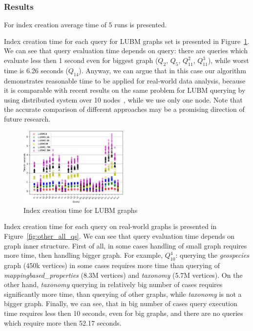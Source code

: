 \subsubsection{Results}

For index creation average time of 5 runs is presented.

Index creation time for each query for LUBM graphs set is presented in Figure~\ref{fig:lubm_all_qs}.
We can see that query evaluation time depends on query: there are queries which evaluate less then 1 second even for biggest graph ($Q_2$, $Q_5$, $Q_{11}^2$, $Q_{11}^3$), while worst time is 6.26 seconds ($Q_{14}$).
Anyway, we can argue that in this case our algorithm demonstrates reasonable time to be applied for real-world data analysis, because it is comparable with recent results on the same problem for LUBM querying by using distributed system over 10 nodes~\cite{Wang2019}, while we use only one node. 
Note that the accurate comparison of different approaches may be a promising direction of future research.

\begin{figure}
   \includegraphics[width=0.48\textwidth]{data/LUBM_all.pdf}
   \caption{Index creation time for LUBM graphs}
   \label{fig:lubm_all_qs}
\end{figure}

Index creation time for each query on real-world graphs is presented in Figure~\ref{fig:other_all_qs}.
We can see that query evaluation time depends on graph inner structure. 
First of all, in some cases handling of small graph requires more time, then handling bigger graph.
For example, $Q_{10}^4$: querying the \textit{geospecies} graph (450k vertices) in some cases requires more time than querying of \textit{mappingbased\_properties} (8.3M vertices) and \textit{taxonomy} (5.7M vertices).
On the other hand, \textit{taxonomy} querying in relatively big number of cases requires significantly more time, than querying of other graphs, while \textit{taxonomy} is not a bigger graph. 
Finally, we can see, that in big number of cases query execution time requires less then 10 seconds, even for big graphs, and there are no queries which require more then 52.17 seconds. 

